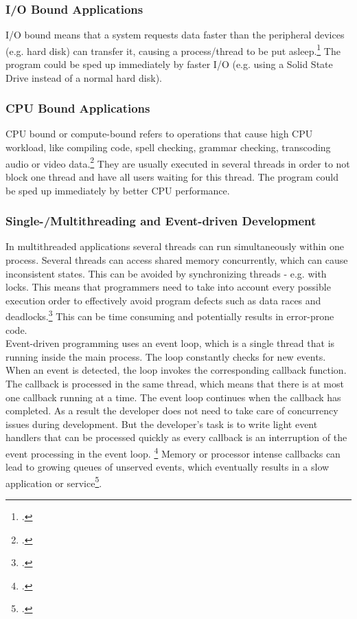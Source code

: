 \subsubsection{I/O Bound Applications}
\label{issue_io}
I/O bound means that a system requests data faster than the peripheral devices
(e.g. hard disk) can transfer it, causing a process/thread to be put
asleep.\footcite[Cf.][10]{Caldera_2003} The program could be sped up immediately
by faster I/O (e.g. using a Solid State Drive instead of a normal hard disk).

\subsubsection{CPU Bound Applications}
\label{issue_cpu}
CPU bound or compute-bound refers to operations that cause high CPU workload,
like compiling code, spell checking, grammar checking, transcoding audio or
video data.\footcite[Cf.][718]{Richter_2010} They are usually executed in
several threads in order to not block one thread and have all users waiting for
this thread. The program could be sped up immediately by better CPU performance.

\subsubsection{Single-/Multithreading and Event-driven Development}
\label{issue_threads}

In multithreaded applications several threads can run simultaneously within one 
process. Several threads can access shared memory concurrently, which can
cause inconsistent states. This can be avoided by synchronizing threads - e.g.
with locks. This means that programmers need to take into account every possible
execution order to effectively avoid program defects such as data races and 
deadlocks.\footcite[Cf.][10]{Breshears_2009}
This can be time consuming and potentially results in error-prone code.\\

Event-driven programming uses an event loop, which is a single thread that is
running inside the main process.
The loop constantly checks for new events. When an event is detected, the loop
invokes the corresponding callback function. The callback is processed in the
same thread, which means that there is at most one callback running at a time.
The event loop continues when the callback has completed. As a result the
developer does not need to take care of concurrency issues during development.
But the developer's task is to write light event handlers that can be processed
quickly as every callback is an interruption of the event processing in the
event loop. \footcite[Cf.][]{Croucher_2010} Memory or processor intense callbacks
can lead to growing queues of unserved events, which eventually results
in a slow application or service\footcite[Cf.][48]{teixeira_2012}.

